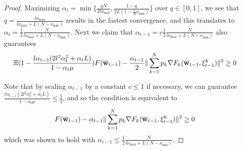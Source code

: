 \begin{proof}
	Maximizing $\alpha_{t}=\min\{\frac{qN}{2l\nu_{\max}},\frac{1-q}{2L(1-\frac{1}{N}\nu_{\min})}\}$
	over $q\in[0,1]$, we see that $q=\frac{l\nu_{\max}}{l\nu_{\max}+L(N-\nu_{\min})}$
	results in the fastest convergence, and this translates to $\alpha_{t}=\frac{1}{2}\frac{N}{l\nu_{\max}+L(N-\nu_{\min})}$.
	Next we claim that $\alpha_{t-1}=c\frac{1}{2}\frac{N}{l\nu_{\max}+L(N-\nu_{\min})}$
	also guarantees
	\begin{align*}
	\mathbb{E}(1-\frac{l\alpha_{t-1}(2l^{2}\alpha_{t}^{2}+\alpha_{t}L)}{1-\alpha_{t}\mu})F({\overline{\mathbf{w}}}_{t-1})-\frac{\alpha_{t-1}}{2}\|\sum_{k=1}^{N}p_{k}\nabla F_{k}({\overline{\mathbf{w}}}_{t-1},\xi_{t-1}^{k})\|^{2} & \geq0
	\end{align*}
	
	Note that by scaling $\alpha_{t-1}$ by a constant $c\leq1$ if necessary,
	we can guarantee $\frac{l\alpha_{t-1}(2l^{2}\alpha_{t}^{2}+\alpha_{t}L)}{1-\alpha_{t}\mu}\leq\frac{1}{2}$,
	and so the condition is equivalent to 
	\begin{align*}
	F({\overline{\mathbf{w}}}_{t-1})-\alpha_{t-1}\|\sum_{k=1}^{N}p_{k}\nabla F_{k}({\overline{\mathbf{w}}}_{t-1},\xi_{t-1}^{k})\|^{2} & \geq0
	\end{align*}
	which was shown to hold with $\alpha_{t-1}\leq\frac{1}{2}\frac{N}{l\nu_{\max}+L(N-\nu_{\min})}$. 
	

\end{proof}
